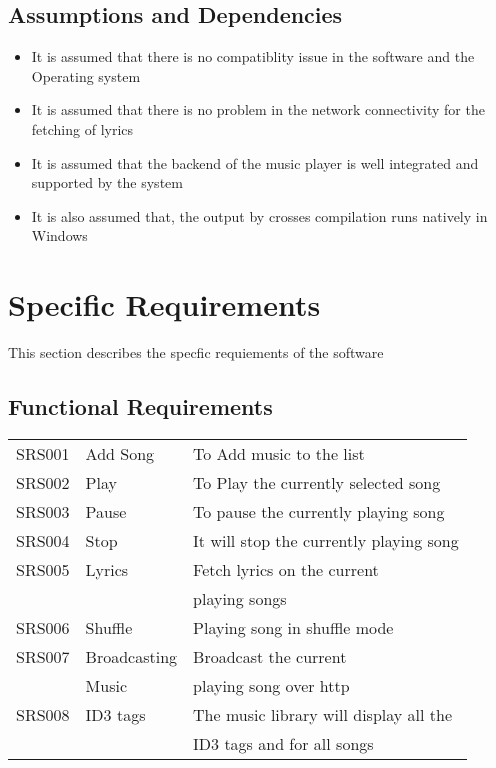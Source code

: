 \subsection{Assumptions and Dependencies}
\begin{itemize}
\item{It is assumed that there is no compatiblity issue in the software and the Operating system}
\item{It is assumed that there is no problem in the network connectivity for the fetching of lyrics}
\item{It is assumed that the backend of the music player is well integrated and supported by the system}
\item{It is also assumed that, the output by crosses compilation runs natively in Windows}
\end{itemize}
\pagebreak

\section{Specific Requirements}
This section describes the specfic requiements of the software
\subsection{Functional Requirements}
\begin{tabular}{ll|l}
	SRS001 & Add Song & To Add music to the list \\
	SRS002 & Play & To Play the currently selected song \\
	SRS003 & Pause & To pause the currently playing song \\
	SRS004 & Stop & It will stop the currently playing song \\
	SRS005 & Lyrics & Fetch lyrics on the current \\
	~ & ~ & playing songs \\
	SRS006 & Shuffle & Playing song in shuffle mode \\
	SRS007 & Broadcasting  & Broadcast the current \\
		~ & Music & playing song over http \\
	SRS008 & ID3 tags & The music library will display all the \\
	~ & ~ & ID3 tags and for all songs \\
\end{tabular}
